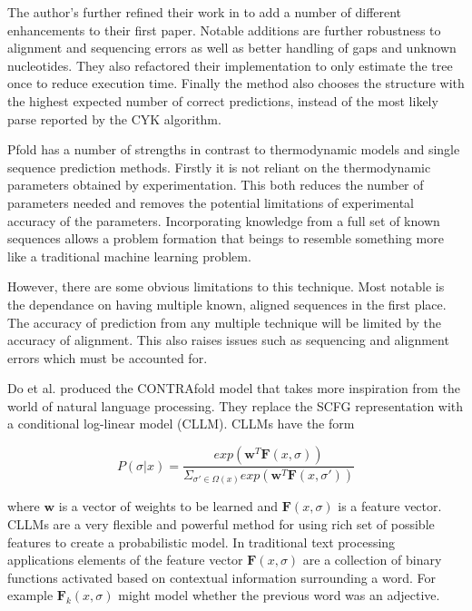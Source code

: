 \documentclass[journal]{IEEEtran}
\begin{document}
The author's further refined their work in \cite{knudsen2003pfold} to add a number of different enhancements to their first paper. Notable additions are further robustness to alignment and sequencing errors as well as better handling of gaps and unknown nucleotides. They also refactored their implementation to only estimate the tree once to reduce execution time. Finally the method also chooses the structure with the highest expected number of correct predictions, instead of the most likely parse reported by the CYK algorithm.

Pfold has a number of strengths in contrast to thermodynamic models and single sequence prediction methods. Firstly it is not reliant on the thermodynamic parameters obtained by experimentation. This both reduces the number of parameters needed and removes the potential limitations of experimental accuracy of the parameters. Incorporating knowledge from a full set of known sequences allows a problem formation that beings to resemble something more like a traditional machine learning problem.

However, there are some obvious limitations to this technique. Most notable is the dependance on having multiple known, aligned sequences in the first place. The accuracy of prediction from any multiple technique will be limited by the accuracy of alignment. This also raises issues such as sequencing and alignment errors which must be accounted for.

Do et al. \cite{do2006contrafold} produced the CONTRAfold model that takes more inspiration from the world of natural language processing. They replace the SCFG representation with a conditional log-linear model (CLLM). CLLMs have the form

\begin{equation}
	\label{eq:cllm}
	P(\sigma|x) = \frac{exp(\mathbf{w}^T \mathbf{F}(x, \sigma))}{\Sigma_{\sigma'\in \Omega(x)} exp(\mathbf{w}^T \mathbf{F}(x, \sigma'))} 
\end{equation}

where $\mathbf{w}$ is a vector of weights to be learned and $\mathbf{F}(x, \sigma)$ is a feature vector. CLLMs are a very flexible and powerful method for using rich set of possible features to create a probabilistic model. In traditional text processing applications elements of the feature vector $\mathbf{F}(x, \sigma)$ are a collection of binary functions activated based on contextual information surrounding a word. For example $\mathbf{F}_k(x, \sigma)$ might model whether the previous word was an adjective. 
\end{document}
